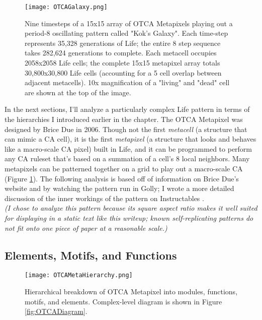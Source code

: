 {\begin{figure}
  \texttt{[image: OTCAGalaxy.png]}
  \caption{Nine timesteps of a 15x15 array of OTCA Metapixels playing out a period-8 oscillating pattern called "Kok's Galaxy".  Each time-step represents 35,328 generations of Life; the entire 8 step sequence takes 282,624 generations to complete.  Each metacell occupies 2058x2058 Life cells; the complete 15x15 metapixel array totals 30,800x30,800 Life cells (accounting for a 5 cell overlap between adjacent metacells).  10x magnification of a "living" and "dead" cell are shown at the top of the image.}
  \label{fig:OTCAGalaxy}
\end{figure}

In the next sections, I'll analyze a particularly complex Life pattern in terms of the hierarchies I introduced earlier in the chapter.  The OTCA Metapixel was designed by Brice Due in 2006.  Though not the first \textit{metacell} (a structure that can mimic a CA cell), it is the first \textit{metapixel} (a structure that looks and behaves like a macro-scale CA pixel) built in Life, and it can be programmed to perform any CA ruleset that's based on a summation of a cell's 8 local neighbors.  Many metapixels can be patterned together on a grid to play out a macro-scale CA (Figure \ref{fig:OTCAGalaxy}).  The following analysis is based off of information on Brice Due's website \cite{Due2006} and by watching the pattern run in Golly; I wrote a more detailed discussion of the inner workings of the pattern on Instructables \cite{Ghassaei2015}.\\

\textit{(I chose to analyze this pattern because its square aspect ratio makes it well suited for displaying in a static text like this writeup; known self-replicating patterns do not fit onto one piece of paper at a reasonable scale.)}  

\subsection{Elements, Motifs, and Functions}

\begin{sidewaysfigure}
  \texttt{[image: OTCAMetaHierarchy.png]}
  \caption{Hierarchical breakdown of OTCA Metapixel into modules, functions, motifs, and elements.  Complex-level diagram is shown in Figure \ref{fig:OTCADiagram}.}
  \label{fig:OTCAMetaHierarchy}
\end{sidewaysfigure}

}
